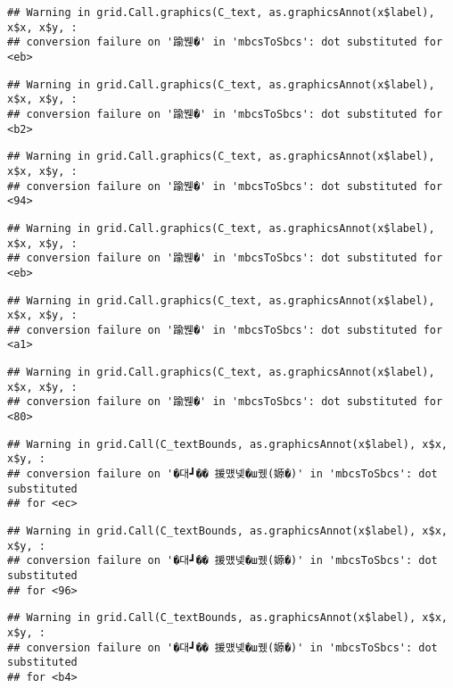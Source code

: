 \documentclass[
]{article}
\begin{document}
\begin{verbatim}
## Warning in grid.Call.graphics(C_text, as.graphicsAnnot(x$label), x$x, x$y, :
## conversion failure on '踰붾�' in 'mbcsToSbcs': dot substituted for <eb>
\end{verbatim}

\begin{verbatim}
## Warning in grid.Call.graphics(C_text, as.graphicsAnnot(x$label), x$x, x$y, :
## conversion failure on '踰붾�' in 'mbcsToSbcs': dot substituted for <b2>
\end{verbatim}

\begin{verbatim}
## Warning in grid.Call.graphics(C_text, as.graphicsAnnot(x$label), x$x, x$y, :
## conversion failure on '踰붾�' in 'mbcsToSbcs': dot substituted for <94>
\end{verbatim}

\begin{verbatim}
## Warning in grid.Call.graphics(C_text, as.graphicsAnnot(x$label), x$x, x$y, :
## conversion failure on '踰붾�' in 'mbcsToSbcs': dot substituted for <eb>
\end{verbatim}

\begin{verbatim}
## Warning in grid.Call.graphics(C_text, as.graphicsAnnot(x$label), x$x, x$y, :
## conversion failure on '踰붾�' in 'mbcsToSbcs': dot substituted for <a1>
\end{verbatim}

\begin{verbatim}
## Warning in grid.Call.graphics(C_text, as.graphicsAnnot(x$label), x$x, x$y, :
## conversion failure on '踰붾�' in 'mbcsToSbcs': dot substituted for <80>
\end{verbatim}

\begin{verbatim}
## Warning in grid.Call(C_textBounds, as.graphicsAnnot(x$label), x$x, x$y, :
## conversion failure on '�대┛�� 援먰넻�ш퀬(嫄�)' in 'mbcsToSbcs': dot substituted
## for <ec>
\end{verbatim}

\begin{verbatim}
## Warning in grid.Call(C_textBounds, as.graphicsAnnot(x$label), x$x, x$y, :
## conversion failure on '�대┛�� 援먰넻�ш퀬(嫄�)' in 'mbcsToSbcs': dot substituted
## for <96>
\end{verbatim}

\begin{verbatim}
## Warning in grid.Call(C_textBounds, as.graphicsAnnot(x$label), x$x, x$y, :
## conversion failure on '�대┛�� 援먰넻�ш퀬(嫄�)' in 'mbcsToSbcs': dot substituted
## for <b4>
\end{verbatim}
\end{document}
